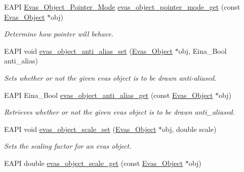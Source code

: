 \begin{DoxyCompactItemize}
EAPI \hyperlink{group__Evas__Object__Group__Extras_ga27baac4c63b590de109e3e3f0d941483}{Evas\_\-Object\_\-Pointer\_\-Mode} \hyperlink{group__Evas__Object__Group__Extras_ga80faa9ce3b9ab59fe7b4bf6924b293ac}{evas\_\-object\_\-pointer\_\-mode\_\-get} (const \hyperlink{group__Evas__Object__Group_ga9e19e6dd1f517a0ba437c0114d3e7c97}{Evas\_\-Object} $\ast$obj)
\begin{DoxyCompactList}\small\item\em Determine how pointer will behave. \item\end{DoxyCompactList}\item 
EAPI void \hyperlink{group__Evas__Object__Group__Extras_gaf0c7d4c49695749fa616d0abdbd5ddeb}{evas\_\-object\_\-anti\_\-alias\_\-set} (\hyperlink{group__Evas__Object__Group_ga9e19e6dd1f517a0ba437c0114d3e7c97}{Evas\_\-Object} $\ast$obj, Eina\_\-Bool anti\_\-alias)
\begin{DoxyCompactList}\small\item\em Sets whether or not the given evas object is to be drawn anti-\/aliased. \item\end{DoxyCompactList}\item 
EAPI Eina\_\-Bool \hyperlink{group__Evas__Object__Group__Extras_ga3308cb65716beb4ce826b9701e23159a}{evas\_\-object\_\-anti\_\-alias\_\-get} (const \hyperlink{group__Evas__Object__Group_ga9e19e6dd1f517a0ba437c0114d3e7c97}{Evas\_\-Object} $\ast$obj)
\begin{DoxyCompactList}\small\item\em Retrieves whether or not the given evas object is to be drawn anti\_\-aliased. \item\end{DoxyCompactList}\item 
EAPI void \hyperlink{group__Evas__Object__Group__Extras_gaf010777fa1b58bd1c9c8093d2edc62e9}{evas\_\-object\_\-scale\_\-set} (\hyperlink{group__Evas__Object__Group_ga9e19e6dd1f517a0ba437c0114d3e7c97}{Evas\_\-Object} $\ast$obj, double scale)
\begin{DoxyCompactList}\small\item\em Sets the scaling factor for an evas object. \item\end{DoxyCompactList}\item 
EAPI double \hyperlink{group__Evas__Object__Group__Extras_ga1c0aca3af434f0bc0fa8732248b197ba}{evas\_\-object\_\-scale\_\-get} (const \hyperlink{group__Evas__Object__Group_ga9e19e6dd1f517a0ba437c0114d3e7c97}{Evas\_\-Object} $\ast$obj)

\end{DoxyCompactItemize}
